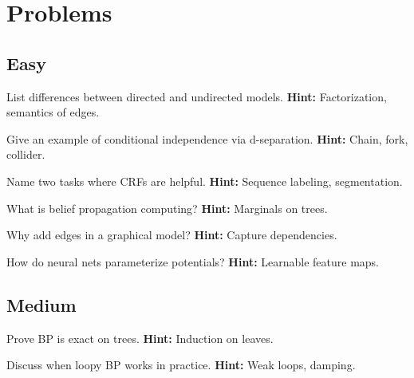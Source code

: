 
\section*{Problems}

\subsection*{Easy}
\begin{problem}
List differences between directed and undirected models.
\textbf{Hint:} Factorization, semantics of edges.
\end{problem}

\begin{problem}[d-separation]
Give an example of conditional independence via d-separation.
\textbf{Hint:} Chain, fork, collider.
\end{problem}

\begin{problem}
Name two tasks where CRFs are helpful.
\textbf{Hint:} Sequence labeling, segmentation.
\end{problem}

\begin{problem}
What is belief propagation computing?
\textbf{Hint:} Marginals on trees.
\end{problem}

\begin{problem}
Why add edges in a graphical model?
\textbf{Hint:} Capture dependencies.
\end{problem}

\begin{problem}
How do neural nets parameterize potentials?
\textbf{Hint:} Learnable feature maps.
\end{problem}

\subsection*{Medium}
\begin{problem}[BP on Trees]
Prove BP is exact on trees.
\textbf{Hint:} Induction on leaves.
\end{problem}

\begin{problem}[Loopy BP]
Discuss when loopy BP works in practice.
\textbf{Hint:} Weak loops, damping.
\end{problem}


